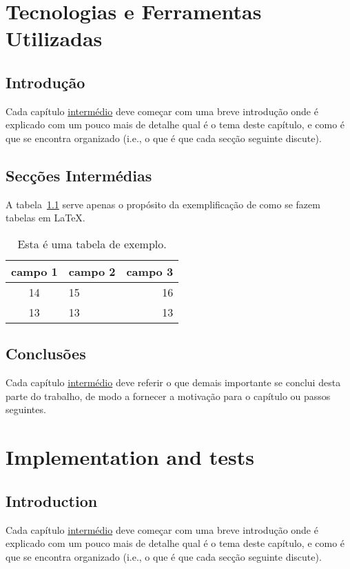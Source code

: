 \documentclass[titlepage,12pt,a4paper,times]{book}
\begin{document}
\chapter{Tecnologias e Ferramentas Utilizadas}
\label{chap:tecno-ferra}

\section{Introdução}
\label{chap3:sec:intro}
Cada capítulo \underline{intermédio} deve começar com uma breve introdução onde
é explicado com um pouco mais de detalhe qual é o tema deste capítulo, e como é
que se encontra organizado (i.e., o que é que cada secção seguinte discute).

\section{Secções Intermédias}
\label{chap3:sec:...}

A tabela~\ref{tab:exemplo} serve apenas o propósito da exemplificação de como
se fazem tabelas em \LaTeX.
%
\begin{table}
\centering
\begin{tabular}{|c|lr|}
\hline
\textbf{campo 1} & \textbf{campo 2} & \textbf{campo 3}\\
\hline
\hline
14 & 15 & 16 \\
\hline
13 & 13 & 13 \\
\hline
\end{tabular}
\caption{Esta é uma tabela de exemplo.}
\label{tab:exemplo}
\end{table}

\section{Conclusões}
\label{chap3:sec:concs}
Cada capítulo \underline{intermédio} deve referir o que demais importante se
conclui desta parte do trabalho, de modo a fornecer a motivação para o capítulo
ou passos seguintes.

\chapter{Implementation and tests}
\label{chap:imp-test}

\section{Introduction}
\label{chap4:sec:intro}
Cada capítulo \underline{intermédio} deve começar com uma breve introdução onde
é explicado com um pouco mais de detalhe qual é o tema deste capítulo, e como é
que se encontra organizado (i.e., o que é que cada secção seguinte discute).
\end{document}
